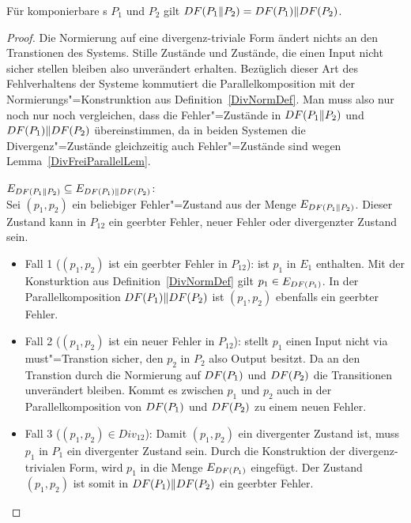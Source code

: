 \begin{Lem}
  Für komponierbare \MEIO{}s $P_1$ und $P_2$ gilt $DF (P_1\|P_2) = DF (P_1)\|
  DF (P_2)$.
\end{Lem}
\begin{proof}
  Die Normierung auf eine divergenz-triviale Form ändert nichts an den
  Transtionen des Systems. Stille Zustände und Zustände, die einen Input nicht
  sicher stellen bleiben also unverändert erhalten. Bezüglich dieser Art des
  Fehlverhaltens der Systeme kommutiert die Parallelkomposition mit der
  Normierungs"=Konstrunktion aus Definition~\ref{DivNormDef}. Man muss also nur
  noch nur noch vergleichen, dass die Fehler"=Zustände in $DF (P_1\|P_2)$ und
  $DF (P_1)\| DF (P_2)$ übereinstimmen, da in beiden Systemen die
  Divergenz"=Zustände gleichzeitig auch Fehler"=Zustände sind wegen
  Lemma~\ref{DivFreiParallelLem}.

  $E_{DF (P_1\|P_2)} \subseteq E_{DF (P_1)\| DF (P_2)}$:\\
  Sei $(p_1,p_2)$ ein beliebiger Fehler"=Zustand aus der Menge $E_{DF
  (P_1\|P_2)}$. Dieser Zustand kann in $P_{12}$ ein geerbter Fehler, neuer
  Fehler oder divergenzter Zustand sein.
  \begin{itemize}
    \item Fall 1 ($(p_1,p_2)$ ist ein geerbter Fehler in $P_{12}$): \OBdA{} ist
      $p_1$ in $E_1$ enthalten. Mit der Konsturktion aus
      Definition~\ref{DivNormDef} gilt $p_1\in E_{DF (P_1)}$. In der
      Parallelkomposition $DF (P_1)\|DF (P_2)$ ist $(p_1,p_2)$ ebenfalls ein
      geerbter Fehler.
    \item Fall 2 ($(p_1,p_2)$ ist ein neuer Fehler in $P_{12}$): \OBdA{} stellt
      $p_1$ einen Input nicht via must"=Transtion sicher, den $p_2$ in $P_2$
      also Output besitzt. Da an den Transtion durch die Normierung auf $DF
      (P_1)$ und $DF (P_2)$ die Transitionen unverändert bleiben. Kommt es
      zwischen $p_1$ und $p_2$ auch in der Parallelkomposition von $DF (P_1)$
      und $DF (P_2)$ zu einem neuen Fehler.
    \item Fall 3 ($(p_1,p_2)\in Div_{12}$): Damit $(p_1,p_2)$ ein divergenter
      Zustand ist, muss \oBdA{} $p_1$ in $P_1$ ein divergenter Zustand sein.
      Durch die Konstruktion der divergenz-trivialen Form, wird $p_1$ in die
      Menge $E_{DF (P_1)}$ eingefügt. Der Zustand $(p_1,p_2)$ ist somit in
      $DF (P_1)\|DF (P_2)$ ein geerbter Fehler.
  \end{itemize}


\end{proof}
